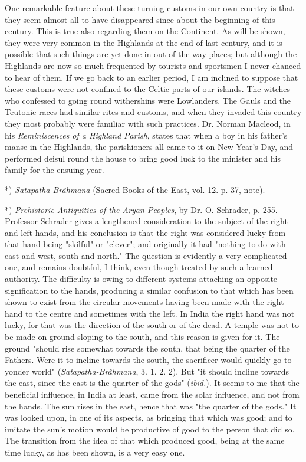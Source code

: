 \documentclass[a4paper, 11pt, oneside, polutonikogreek, english]{article}
\begin{document}
One remarkable feature about these turning customs in our own country is that they seem almost all to have disappeared since about the beginning of this century. This is true also regarding them on the Continent. As will be shown, they were very common in the Highlands at the end of last century, and it is possible that such things are yet done in out-of-the-way places; but although the Highlands are now so much frequented by tourists and sportsmen I never chanced to hear of them. If we go back to an earlier period, I am inclined to suppose that these customs were not confined to the Celtic parts of our islands. The witches who confessed to going round withershins were Lowlanders. The Gauls and the Teutonic races had similar rites and customs, and when they invaded this country they most probably were familiar with such practices. Dr. Norman Macleod, in his \emph{Reminiscences of a Highland Parish}, states that when a boy in his father's manse in the Highlands, the parishioners all came to it on New Year's Day, and performed deisul round the house to bring good luck to the minister and his family for the ensuing year.

*) \emph{Satapatha-Brâhmana} (Sacred Books of the East, vol. 12. p. 37, note).

*) \emph{Prehistoric Antiquities of the Aryan Peoples}, by Dr. O. Schrader, p. 255. Professor Schrader gives a lengthened consideration to the subject of the right and left hands, and his conclusion is that the right was considered lucky from that hand being "skilful" or "clever"; and originally it had "nothing to do with east and west, south and north." The question is evidently a very complicated one, and remains doubtful, I think, even though treated by such a learned authority. The difficulty is owing to different systems attaching an opposite signification to the hands, producing a similar confusion to that which has been shown to exist from the circular movements having been made with the right hand to the centre and sometimes with the left. In India the right hand was not lucky, for that was the direction of the south or of the dead. A temple was not to be made on ground sloping to the south, and this reason is given for it. The ground "should rise somewhat towards the south, that being the quarter of the Fathers. Were it to incline towards the south, the sacrificer would quickly go to yonder world" (\emph{Satapatha-Brâhmana}, 3. 1. 2. 2). But "it should incline towards the east, since the east is the quarter of the gods" (\emph{ibid.}). It seems to me that the beneficial influence, in India at least, came from the solar influence, and not from the hands. The sun rises in the east, hence that was "the quarter of the gods." It was looked upon, in one of its aspects, as bringing that which was good; and to imitate the sun's motion would be productive of good to the person that did so. The transition from the idea of that which produced good, being at the same time lucky, as has been shown, is a very easy one.
\end{document}

